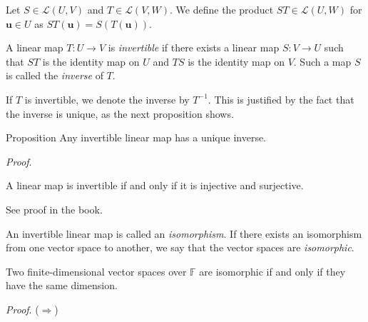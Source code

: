 \documentclass [aspectratio=169]{beamer}
\newcommand{\bu}{{\mathbf{u}}}
\newcommand{\F}{{\mathbb{F}}}
\newcommand{\cL}{{\mathcal{L}}}
\newcommand{\inv}{{-1}}
\begin{document}
\begin{frame}
\begin{definition}
Let $S \in \cL(U,V)$ and $T \in \cL(V,W)$. We define the product $ST \in \cL(U,W)$ for $\bu\in U$ as $ST(\bu) = S(T(\bu))$.
\end{definition}

\vspace{1em}

\begin{definition}
A linear map $T: U \to V$ is \emph{invertible} if there exists a linear map $S: V \to U$ such that $ST$ is the identity map on $U$ and $TS$ is the identity map on $V$. Such a map $S$ is called the \emph{inverse} of $T$. 
\end{definition}

\vspace{1em}

If $T$ is invertible, we denote the inverse by $T^\inv$. This is justified by the fact that the inverse is unique, as the next proposition shows.

\end{frame}


\begin{frame}
\begin{exampleblock}{Proposition}
Any invertible linear map has a unique inverse.
\end{exampleblock}
\textit{Proof}.
\vspace{3.5cm}

\end{frame}

\begin{frame}

\begin{theorem}
A linear map is invertible if and only if it is injective and surjective.
\end{theorem}

See proof in the book.

\vspace{2em}

\begin{definition}
An invertible linear map is called an \emph{isomorphism}. If there exists an isomorphism from one vector space to another, we say that the vector spaces are \emph{isomorphic}.
\end{definition}
\end{frame}

\begin{frame}
\begin{theorem}
Two finite-dimensional vector spaces over $\F$ are isomorphic if and only if they have the same dimension.
\end{theorem}
\textit{Proof}.
($\Rightarrow$) 

\vspace{4cm}
\end{frame}
\end{document}
